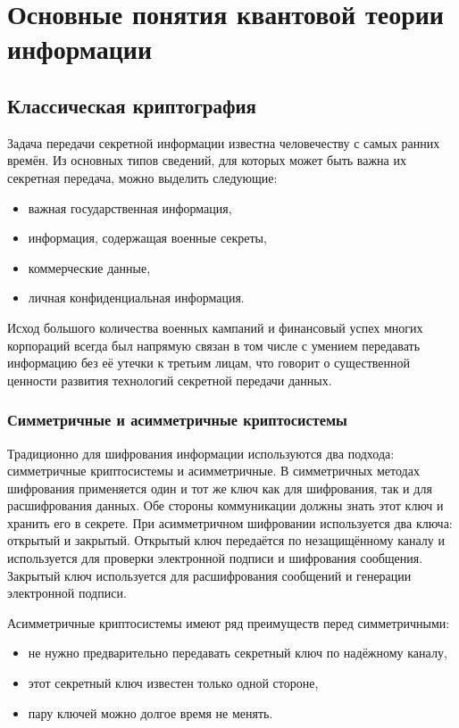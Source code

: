 \chapter{Основные понятия квантовой теории информации}				%

\section{Классическая криптография}
Задача передачи секретной информации известна человечеству с самых ранних времён. Из основных типов сведений, для которых может быть важна их
секретная передача, можно выделить следующие:
\begin{itemize}
  \item важная государственная информация,
  \item информация, содержащая военные секреты,
  \item коммерческие данные,
  \item личная конфиденциальная информация.
\end{itemize}

Исход большого количества военных кампаний и финансовый успех многих корпораций всегда был напрямую связан в том числе с умением передавать
информацию без её утечки к третьим лицам, что говорит о существенной ценности развития технологий секретной передачи данных.

\subsection{Симметричные и асимметричные криптосистемы}
Традиционно для шифрования информации используются два подхода: симметричные криптосистемы и асимметричные.
В симметричных методах шифрования применяется один и тот же ключ как для шифрования, так и для расшифрования данных. Обе стороны коммуникации должны знать этот ключ и хранить его в секрете.
При асимметричном шифровании используется два ключа: открытый и закрытый. Открытый ключ передаётся по незащищённому каналу и используется для проверки электронной подписи и шифрования сообщения.
Закрытый ключ используется для расшифрования сообщений и генерации электронной подписи. 

Асимметричные криптосистемы имеют ряд преимуществ перед симметричными: 
\begin{itemize}
  \item не нужно предварительно передавать секретный ключ по надёжному каналу,
  \item этот секретный ключ известен только одной стороне, 
  \item пару ключей можно долгое время не менять.
\end{itemize}

